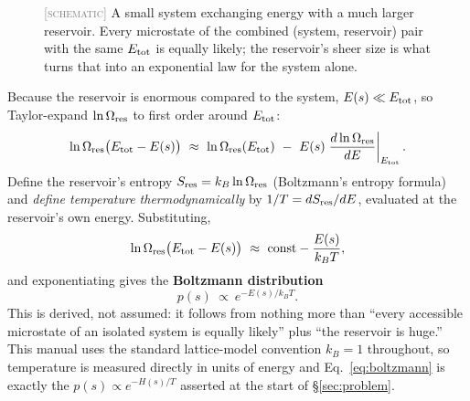 \documentclass[11pt,a4paper]{article}
\newcommand{\SCHEM}{\textcolor{gray}{\footnotesize[\textsc{schematic}]}}
\begin{document}
\begin{figure}[H]\centering
{}
\caption{\SCHEM{} A small system exchanging energy with a much larger reservoir. Every microstate
of the combined (system, reservoir) pair with the same $E_{\rm tot}$ is equally likely; the
reservoir's sheer size is what turns that into an exponential law for the system alone.}
\label{fig:reservoir}
\end{figure}

Because the reservoir is enormous compared to the system, $E(s)\ll E_{\rm tot}$, so Taylor-expand
$\ln\Omega_{\rm res}$ to first order around $E_{\rm tot}$:
\begin{equation}
\ln\Omega_{\rm res}\big(E_{\rm tot}-E(s)\big)\ \approx\ \ln\Omega_{\rm res}(E_{\rm tot})\ -\
E(s)\left.\frac{d\ln\Omega_{\rm res}}{dE}\right|_{E_{\rm tot}}.
\end{equation}
Define the reservoir's entropy $S_{\rm res}=k_B\ln\Omega_{\rm res}$ (Boltzmann's entropy formula)
and \emph{define temperature thermodynamically} by $1/T=dS_{\rm res}/dE$, evaluated at the
reservoir's own energy. Substituting,
\begin{equation}
\ln\Omega_{\rm res}\big(E_{\rm tot}-E(s)\big)\ \approx\ \text{const}-\frac{E(s)}{k_BT},
\end{equation}
and exponentiating gives the \textbf{Boltzmann distribution}
\begin{equation}\label{eq:boltzmann}
p(s)\ \propto\ e^{-E(s)/k_BT}.
\end{equation}
This is derived, not assumed: it follows from nothing more than ``every accessible microstate of
an isolated system is equally likely'' plus ``the reservoir is huge.'' This manual uses the
standard lattice-model convention $k_B=1$ throughout, so temperature is measured directly in
units of energy and Eq.~\eqref{eq:boltzmann} is exactly the $p(s)\propto e^{-H(s)/T}$ asserted at
the start of \S\ref{sec:problem}.
\end{document}
